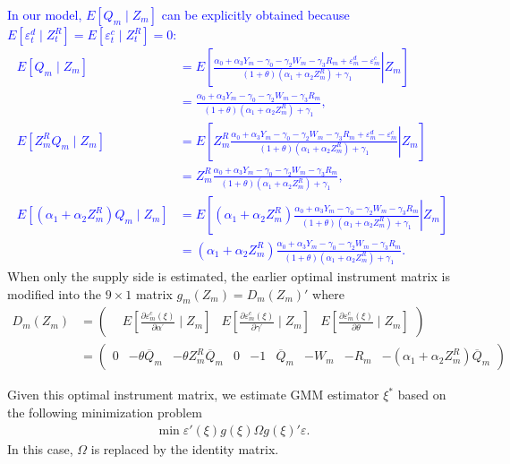 \documentclass[11pt, a4paper]{article}
\begin{document}
\textcolor{blue}{
In our model, $E[Q_{m}\mid Z_{m}]$ can be explicitly obtained because $E[\varepsilon_{t}^{d}\mid Z_{t}^{R}] = E[\varepsilon_{t}^{c}\mid Z_{t}^{R}] = 0 $:
\begin{align*}
    E[Q_{m}\mid Z_{m}] &=E\left[\left.\frac{\alpha_0 + \alpha_3 Y_m - \gamma_0 - \gamma_2 W_{m} - \gamma_3 R_{m} + \varepsilon^{d}_{m} - \varepsilon^{c}_{m}}{(1 + \theta) (\alpha_1 + \alpha_2 Z^{R}_{m}) + \gamma_1}\right| Z_{m}\right] \\
    & = \frac{\alpha_0 + \alpha_3 Y_m - \gamma_0 - \gamma_2 W_{m} - \gamma_3 R_{m}}{(1 + \theta) (\alpha_1 + \alpha_2 Z^{R}_{m}) + \gamma_1},\\
    E[Z^{R}_{m}Q_{m}\mid Z_{m}] &=E\left[\left. Z^{R}_{m}\frac{\alpha_0 + \alpha_3 Y_m - \gamma_0 - \gamma_2 W_{m} - \gamma_3 R_{m} + \varepsilon^{d}_{m} - \varepsilon^{c}_{m}}{(1 + \theta) (\alpha_1 + \alpha_2 Z^{R}_{m}) + \gamma_1}\right | Z_{m}\right]\\
    & = Z^{R}_{m}\frac{\alpha_0 + \alpha_3 Y_m - \gamma_0 - \gamma_2 W_{m} - \gamma_3 R_{m}}{(1 + \theta) (\alpha_1 + \alpha_2 Z^{R}_{m}) + \gamma_1},\\
    E[(\alpha_1 + \alpha_2 Z^{R}_m)Q_{m}\mid Z_{m}] &=E\left[\left. (\alpha_1 + \alpha_2 Z^{R}_m)\frac{\alpha_0 + \alpha_3 Y_m - \gamma_0 - \gamma_2 W_{m} - \gamma_3 R_{m}}{(1 + \theta) (\alpha_1 + \alpha_2 Z^{R}_{m}) + \gamma_1}\right | Z_{m}\right]\\
    &= (\alpha_1 + \alpha_2 Z^{R}_m)\frac{\alpha_0 + \alpha_3 Y_m - \gamma_0 - \gamma_2 W_{m} - \gamma_3 R_{m}}{(1 + \theta) (\alpha_1 + \alpha_2 Z^{R}_{m}) + \gamma_1}.
\end{align*}
}
When only the supply side is estimated, the earlier optimal instrument matrix is modified into the $9\times 1$ matrix $g_{m}(Z_{m})=D_{m}(Z_{m})'$ where 
\begin{align*}
    D_{m}(Z_{m}) &= \begin{pmatrix}
    & E\left[\frac{\partial \varepsilon_{m}^{c}(\xi)}{\partial \alpha^{\prime}} \mid Z_{m}\right] & 
    E\left[\frac{\partial \varepsilon_{m}^{c}(\xi)}{\partial \gamma^{\prime}} \mid Z_{m}\right] & 
    E\left[\frac{\partial \varepsilon_{m}^{c}(\xi)}{\partial \theta} \mid Z_{m}\right]
    \end{pmatrix} \\
    &=\begin{pmatrix}
    0 &- \theta \overline{Q}_{m} & -\theta Z^{R}_{m}\overline{Q}_{m} & 0 & 
    -1 &
    \overline{Q}_{m} &
    -W_{m} &
    -R_{m} &
    -(\alpha_1 + \alpha_2 Z^{R}_m)\overline{Q}_{m}
    \end{pmatrix}
\end{align*}

Given this optimal instrument matrix, we estimate GMM estimator $\xi^{*}$ based on the following minimization
problem
\begin{align*}
    \min \varepsilon'(\xi)g(\xi)\Omega g(\xi)'\varepsilon . 
\end{align*}
In this case, $\Omega$ is replaced by the identity matrix.
\end{document}
